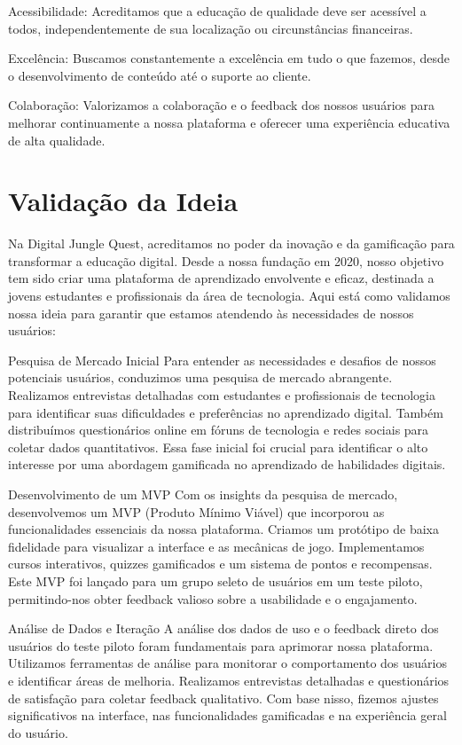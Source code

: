 Acessibilidade:
Acreditamos que a educação de qualidade deve ser acessível a todos, independentemente de sua localização ou circunstâncias financeiras.

Excelência:
Buscamos constantemente a excelência em tudo o que fazemos, desde o desenvolvimento de conteúdo até o suporte ao cliente.

Colaboração:
Valorizamos a colaboração e o feedback dos nossos usuários para melhorar continuamente a nossa plataforma e oferecer uma experiência educativa de alta qualidade.

\chapter{Validação da Ideia}
\label{ch:Validacao_da_Ideia}
Na Digital Jungle Quest, acreditamos no poder da inovação e da gamificação para transformar a educação digital. Desde a nossa fundação em 2020, nosso objetivo tem sido criar uma plataforma de aprendizado envolvente e eficaz, destinada a jovens estudantes e profissionais da área de tecnologia. Aqui está como validamos nossa ideia para garantir que estamos atendendo às necessidades de nossos usuários:

Pesquisa de Mercado Inicial
Para entender as necessidades e desafios de nossos potenciais usuários, conduzimos uma pesquisa de mercado abrangente. Realizamos entrevistas detalhadas com estudantes e profissionais de tecnologia para identificar suas dificuldades e preferências no aprendizado digital. Também distribuímos questionários online em fóruns de tecnologia e redes sociais para coletar dados quantitativos. Essa fase inicial foi crucial para identificar o alto interesse por uma abordagem gamificada no aprendizado de habilidades digitais.

Desenvolvimento de um MVP
Com os insights da pesquisa de mercado, desenvolvemos um MVP (Produto Mínimo Viável) que incorporou as funcionalidades essenciais da nossa plataforma. Criamos um protótipo de baixa fidelidade para visualizar a interface e as mecânicas de jogo. Implementamos cursos interativos, quizzes gamificados e um sistema de pontos e recompensas. Este MVP foi lançado para um grupo seleto de usuários em um teste piloto, permitindo-nos obter feedback valioso sobre a usabilidade e o engajamento.

Análise de Dados e Iteração
A análise dos dados de uso e o feedback direto dos usuários do teste piloto foram fundamentais para aprimorar nossa plataforma. Utilizamos ferramentas de análise para monitorar o comportamento dos usuários e identificar áreas de melhoria. Realizamos entrevistas detalhadas e questionários de satisfação para coletar feedback qualitativo. Com base nisso, fizemos ajustes significativos na interface, nas funcionalidades gamificadas e na experiência geral do usuário.

